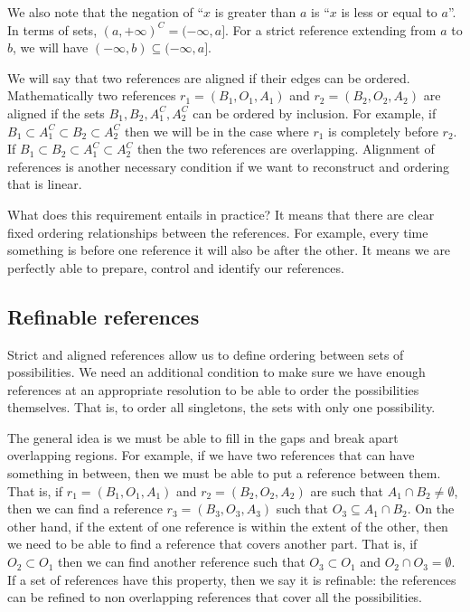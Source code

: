 \documentclass[12pt]{iopart}
\begin{document}
We also note that the negation of ``$x$ is greater than $a$ is ``$x$ is less or equal to $a$''. In terms of sets, $(a, +\infty)^C = (-\infty, a]$. For a strict reference extending from $a$ to $b$, we will have $(-\infty, b) \subseteq (-\infty, a]$.

We will say that two references are aligned if their edges can be ordered. Mathematically two references $r_1 = (B_1, O_1, A_1)$ and $r_2 = (B_2, O_2, A_2)$ are aligned if the sets $B_1, B_2, A_1^C, A_2^C$ can be ordered by inclusion. For example, if $B_1 \subset A_1^C \subset B_2 \subset A_2^C$ then we will be in the case where $r_1$ is completely before $r_2$. If $B_1 \subset B_2 \subset A_1^C \subset A_2^C$ then the two references are overlapping. Alignment of references is another necessary condition if we want to reconstruct and ordering that is linear.

What does this requirement entails in practice? It means that there are clear fixed ordering relationships between the references. For example, every time something is before one reference it will also be after the other. It means we are perfectly able to prepare, control and identify our references.

\subsection{Refinable references}

Strict and aligned references allow us to define ordering between sets of possibilities. We need an additional condition to make sure we have enough references at an appropriate resolution to be able to order the possibilities themselves. That is, to order all singletons, the sets with only one possibility.

The general idea is we must be able to fill in the gaps and break apart overlapping regions. For example, if we have two references that can have something in between, then we must be able to put a reference between them. That is, if $r_1 = (B_1, O_1, A_1)$ and $r_2 = (B_2, O_2, A_2)$ are such that $A_1 \cap B_2 \neq \emptyset$, then we can find a reference $r_3 = (B_3, O_3, A_3)$ such that $O_3 \subseteq A_1 \cap B_2$. On the other hand, if the extent of one reference is within the extent of the other, then we need to be able to find a reference that covers another part. That is, if $O_2 \subset O_1$ then we can find another reference such that $O_3 \subset O_1$ and $O_2 \cap O_3 = \emptyset$. If a set of references have this property, then we say it is refinable: the references can be refined to non overlapping references that cover all the possibilities.
\end{document}

